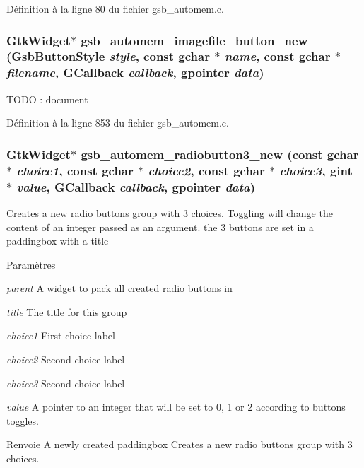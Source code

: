 Définition à la ligne 80 du fichier gsb\_\-automem.c.

\subsubsection[{gsb\_\-automem\_\-imagefile\_\-button\_\-new}]{\setlength{\rightskip}{0pt plus 5cm}GtkWidget$\ast$ gsb\_\-automem\_\-imagefile\_\-button\_\-new ({\bf GsbButtonStyle} {\em style}, \/  const gchar $\ast$ {\em name}, \/  const gchar $\ast$ {\em filename}, \/  GCallback {\em callback}, \/  gpointer {\em data})}\label{gsb__automem_8h_a3216736197a0a8924ab2b562f3c4a4e3}
TODO : document 

Définition à la ligne 853 du fichier gsb\_\-automem.c.

\subsubsection[{gsb\_\-automem\_\-radiobutton3\_\-new}]{\setlength{\rightskip}{0pt plus 5cm}GtkWidget$\ast$ gsb\_\-automem\_\-radiobutton3\_\-new (const gchar $\ast$ {\em choice1}, \/  const gchar $\ast$ {\em choice2}, \/  const gchar $\ast$ {\em choice3}, \/  gint $\ast$ {\em value}, \/  GCallback {\em callback}, \/  gpointer {\em data})}\label{gsb__automem_8h_ab727b352b0f51283d6ab41cbebdef08f}
Creates a new radio buttons group with 3 choices. Toggling will change the content of an integer passed as an argument. the 3 buttons are set in a paddingbox with a title


\begin{DoxyParams}{Paramètres}
\item[{\em parent}]A widget to pack all created radio buttons in \item[{\em title}]The title for this group \item[{\em choice1}]First choice label \item[{\em choice2}]Second choice label \item[{\em choice3}]Second choice label \item[{\em value}]A pointer to an integer that will be set to 0, 1 or 2 according to buttons toggles.\end{DoxyParams}
\begin{DoxyReturn}{Renvoie}
A newly created paddingbox Creates a new radio buttons group with 3 choices.
\end{DoxyReturn}

